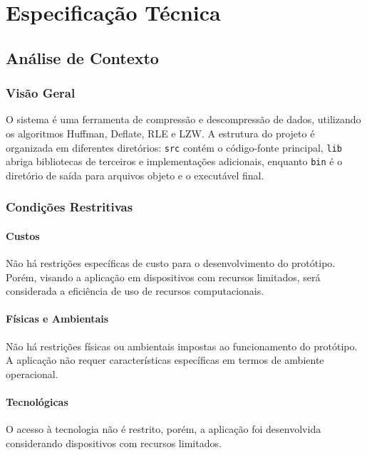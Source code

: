 \chapter{Especificação Técnica}

\section{Análise de Contexto}

\subsection{Visão Geral}

O sistema é uma ferramenta de compressão e descompressão de dados, utilizando os algoritmos Huffman, Deflate, RLE e LZW. A estrutura do projeto é organizada em diferentes diretórios: \texttt{src} contém o código-fonte principal, \texttt{lib} abriga bibliotecas de terceiros e implementações adicionais, enquanto \texttt{bin} é o diretório de saída para arquivos objeto e o executável final.

\subsection{Condições Restritivas}

\subsubsection{Custos}

Não há restrições específicas de custo para o desenvolvimento do protótipo. Porém, visando a aplicação em dispositivos com recursos limitados, será considerada a eficiência de uso de recursos computacionais.

\subsubsection{Físicas e Ambientais}

Não há restrições físicas ou ambientais impostas ao funcionamento do protótipo. A aplicação não requer características específicas em termos de ambiente operacional.

\subsubsection{Tecnológicas}

O acesso à tecnologia não é restrito, porém, a aplicação foi desenvolvida considerando dispositivos com recursos limitados.

